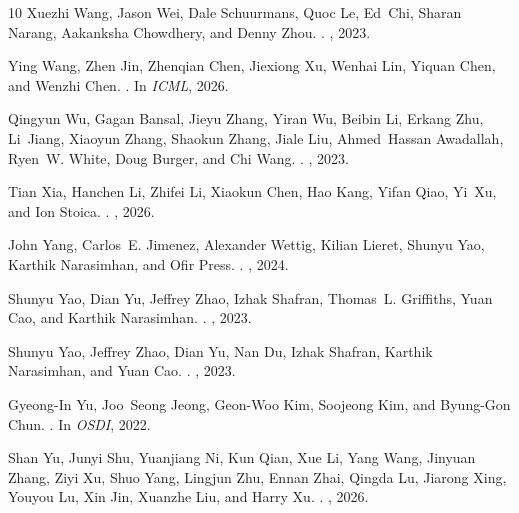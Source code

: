 \begin{thebibliography}{10}
Xuezhi Wang, Jason Wei, Dale Schuurmans, Quoc Le, Ed~Chi, Sharan Narang,
  Aakanksha Chowdhery, and Denny Zhou.
.
, 2023.

Ying Wang, Zhen Jin, Zhenqian Chen, Jiexiong Xu, Wenhai Lin, Yiquan Chen, and
  Wenzhi Chen.
.
\newblock In {\em ICML}, 2026.

Qingyun Wu, Gagan Bansal, Jieyu Zhang, Yiran Wu, Beibin Li, Erkang Zhu,
  Li~Jiang, Xiaoyun Zhang, Shaokun Zhang, Jiale Liu, Ahmed~Hassan Awadallah,
  Ryen~W. White, Doug Burger, and Chi Wang.
.
, 2023.

Tian Xia, Hanchen Li, Zhifei Li, Xiaokun Chen, Hao Kang, Yifan Qiao, Yi~Xu, and
  Ion Stoica.
.
, 2026.

John Yang, Carlos~E. Jimenez, Alexander Wettig, Kilian Lieret, Shunyu Yao,
  Karthik Narasimhan, and Ofir Press.
.
, 2024.

Shunyu Yao, Dian Yu, Jeffrey Zhao, Izhak Shafran, Thomas~L. Griffiths, Yuan
  Cao, and Karthik Narasimhan.
.
, 2023.

Shunyu Yao, Jeffrey Zhao, Dian Yu, Nan Du, Izhak Shafran, Karthik Narasimhan,
  and Yuan Cao.
.
, 2023.

Gyeong-In Yu, Joo~Seong Jeong, Geon-Woo Kim, Soojeong Kim, and Byung-Gon Chun.
.
\newblock In {\em OSDI}, 2022.

Shan Yu, Junyi Shu, Yuanjiang Ni, Kun Qian, Xue Li, Yang Wang, Jinyuan Zhang,
  Ziyi Xu, Shuo Yang, Lingjun Zhu, Ennan Zhai, Qingda Lu, Jiarong Xing, Youyou
  Lu, Xin Jin, Xuanzhe Liu, and Harry Xu.
.
, 2026.


\end{thebibliography}
